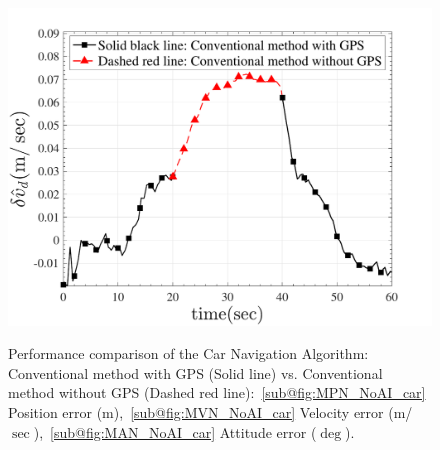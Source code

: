 \documentclass[3p]{elsarticle}
\begin{document}
\begin{figure}[H]
{{	{\includegraphics[width=.33\textwidth]{../Figure/AI-results/CarNoAI/Down velocity error}}}
	}\\
	\caption{%
Performance comparison of the Car Navigation Algorithm: Conventional method with GPS (Solid line) vs. Conventional method without GPS (Dashed red line):~\ref{sub@fig:MPN_NoAI_car} Position error (m),~\ref{sub@fig:MVN_NoAI_car} Velocity error (m/\(\sec\)),~\ref{sub@fig:MAN_NoAI_car} Attitude error (\(\deg\)).
}
\label{fig:NoAI_car}
\end{figure}
\end{document}
